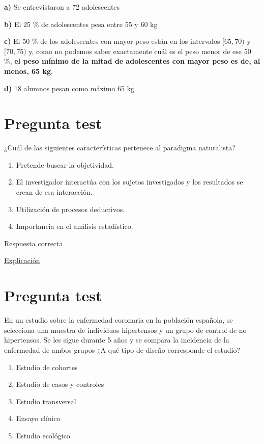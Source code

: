\documentclass[
]{book}
\providecommand{\tightlist}{%
  \setlength{\itemsep}{0pt}\setlength{\parskip}{0pt}}
\begin{document}
\textbf{a)} Se entrevistaron a 72 adolescentes

\textbf{b)} El 25 \% de adolescentes pesa entre 55 y 60 kg

\textbf{c)} El 50 \% de los adolescentes con mayor peso están en los intervalos \([65,70)\) y \([70,75)\) y, como no podemos saber exactamente cuál es el peso menor de ese 50 \%, \textbf{el peso mínimo de la mitad de adolescentes con mayor peso es de, al menos, 65 kg}.

\textbf{d)} 18 alumnos pesan como máximo 65 kg

\hypertarget{pregunta-test-13}{%
\section{Pregunta test}\label{pregunta-test-13}}

¿Cuál de las siguientes características pertenece al paradigma naturalista?

\begin{enumerate}
\def\labelenumi{\alph{enumi})}
\tightlist
\item
  Pretende buscar la objetividad.
\item
  El investigador interactúa con los sujetos investigados y los resultados se crean de esa interacción.
\item
  Utilización de procesos deductivos.
\item
  Importancia en el análisis estadístico.
\end{enumerate}

Respuesta correcta

\href{https://www.encyclo.co.uk/meaning-of-Naturalistic_paradigm}{Explicación}

\hypertarget{pregunta-test-14}{%
\section{Pregunta test}\label{pregunta-test-14}}

En un estudio sobre la enfermedad coronaria en la población española, se selecciona una muestra de individuos hipertensos y un grupo de control de no hipertensos. Se les sigue durante 5 años y se compara la incidencia de la enfermedad de ambos grupos ¿A qué tipo de diseño corresponde el estudio?

\begin{enumerate}
\def\labelenumi{\alph{enumi})}
\tightlist
\item
  Estudio de cohortes
\item
  Estudio de casos y controles
\item
  Estudio transversal
\item
  Ensayo clínico
\item
  Estudio ecológico
\end{enumerate}
\end{document}
